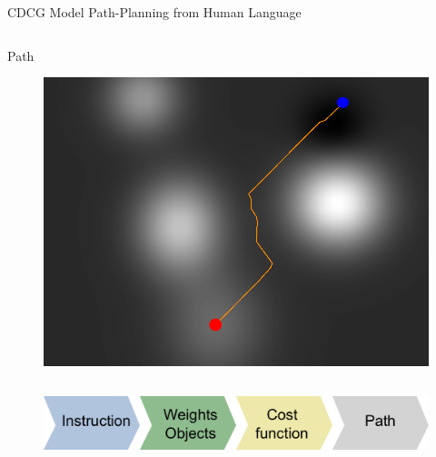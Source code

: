 \begin{frame}{CDCG}{ Model Path-Planning from Human Language }
\begin{columns}
\begin{block}{Path}
\begin{figure}
	\centering
	\includegraphics[width=.9\linewidth]{figure/costmap_path}
\end{figure}
\end{block}
\end{columns}

\begin{figure}
	\centering
	\includegraphics[width=.9\linewidth]{figure/cost_func_inference}
\end{figure}

\end{frame}



